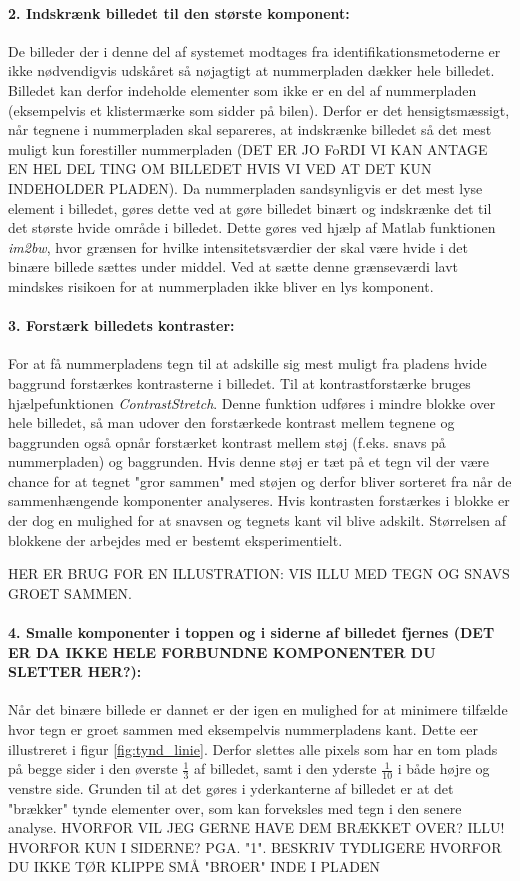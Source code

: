 \paragraph{2. Indskrænk billedet til den største komponent:}
De billeder der i denne del af systemet modtages fra identifikationsmetoderne er ikke nødvendigvis udskåret så nøjagtigt at nummerpladen dækker hele billedet. Billedet kan derfor indeholde elementer som ikke er en del af nummerpladen (eksempelvis et klistermærke som sidder på bilen). Derfor er det hensigtsmæssigt, når tegnene i nummerpladen skal separeres, at indskrænke billedet så det mest muligt kun forestiller nummerpladen (DET ER JO FoRDI VI KAN ANTAGE EN HEL DEL TING OM BILLEDET HVIS VI VED AT DET KUN INDEHOLDER PLADEN). Da nummerpladen sandsynligvis er det mest lyse element i billedet, gøres dette ved at gøre billedet binært og indskrænke det til det største hvide område i billedet. Dette gøres ved hjælp af Matlab funktionen \textit{im2bw}, hvor grænsen for hvilke intensitetsværdier der skal være hvide i det binære billede sættes under middel. Ved at sætte denne grænseværdi lavt mindskes risikoen for at nummerpladen ikke bliver en lys komponent.

\paragraph{3. Forstærk billedets kontraster:}
For at få nummerpladens tegn til at adskille sig mest muligt fra pladens hvide baggrund forstærkes kontrasterne i billedet. Til at kontrastforstærke bruges hjælpefunktionen \textit{ContrastStretch}. Denne funktion udføres i mindre blokke over hele billedet, så man udover den forstærkede kontrast mellem tegnene og baggrunden også opnår forstærket kontrast mellem støj (f.eks. snavs på nummerpladen) og baggrunden. Hvis denne støj er tæt på et tegn vil der være chance for at tegnet "gror sammen" med støjen og derfor bliver sorteret fra når de sammenhængende komponenter analyseres. Hvis kontrasten forstærkes i blokke er der dog en mulighed for at snavsen og tegnets kant vil blive adskilt. Størrelsen af blokkene der arbejdes med er bestemt eksperimentielt.

HER ER BRUG FOR EN ILLUSTRATION: VIS ILLU MED TEGN OG SNAVS GROET SAMMEN.

\paragraph{4. Smalle komponenter i toppen og i siderne af billedet fjernes (DET ER DA IKKE HELE FORBUNDNE KOMPONENTER DU SLETTER HER?):}
Når det binære billede er dannet er der igen en mulighed for at minimere tilfælde hvor tegn er groet sammen med eksempelvis nummerpladens kant. Dette eer illustreret i figur \vref{fig:tynd_linie}. Derfor slettes alle pixels som har en tom plads på begge sider i den øverste $\frac{1}{3}$ af billedet, samt i den yderste $\frac{1}{10}$ i både højre og venstre side. Grunden til at det gøres i yderkanterne af billedet er at det "brækker" tynde elementer over, som kan forveksles med tegn i den senere analyse. HVORFOR VIL JEG GERNE HAVE DEM BRÆKKET OVER? ILLU! HVORFOR KUN I SIDERNE? PGA. "1". BESKRIV TYDLIGERE HVORFOR DU IKKE TØR KLIPPE SMÅ "BROER" INDE I PLADEN

